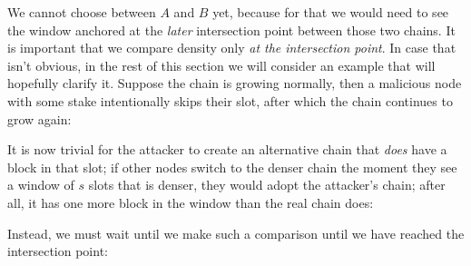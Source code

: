 We cannot choose between $A$ and $B$ yet, because for that we would need to see
the window anchored at the \emph{later} intersection point between those two
chains. It is important that we compare density only \emph{at the intersection
point}. In case that isn't obvious, in the rest of this section we will consider
an example that will hopefully clarify it. Suppose the chain is growing
normally, then a malicious node with some stake intentionally skips their slot,
after which the chain continues to grow again:
%
\begin{center}
\end{center}
%
It is now trivial for the attacker to create an alternative chain that
\emph{does} have a block in that slot; if other nodes switch to the denser chain
the moment they see a window of $s$ slots that is denser, they would adopt the
attacker's chain; after all, it has one more block in the window than the real
chain does:
%
\begin{center}
\end{center}
%
Instead, we must wait until we make such a comparison until we have reached
the intersection point:
%
\begin{center}
\end{center}
